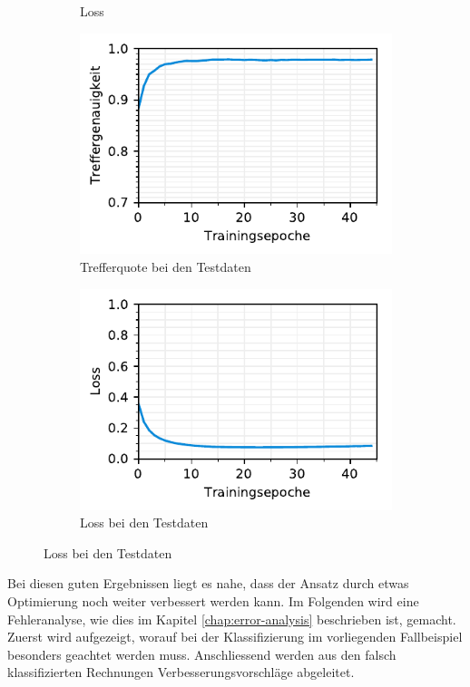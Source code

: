 \begin{figure}[h!]
\begin{subfigure}[b]{0.5\linewidth}
    \caption{Loss} 
    \label{text-class-results:loss} 
    \vspace{2ex}
  \end{subfigure} 
  \begin{subfigure}[b]{0.5\linewidth}
    \centering
    \includegraphics[scale=1]{graphics/matplot/textual-class__val_acc.pdf} 
    \caption{Trefferquote bei den Testdaten} 
    \label{text-class-results:val_acc} 
  \end{subfigure}%
  \begin{subfigure}[b]{0.5\linewidth}
    \centering
    \includegraphics[scale=1]{graphics/matplot/textual-class__val_loss.pdf} 
    \caption{Loss bei den Testdaten} 
    \label{text-class-results:val_loss} 
  \end{subfigure}
  \centering
\end{figure}

Bei diesen guten Ergebnissen liegt es nahe, dass der Ansatz durch etwas Optimierung noch weiter verbessert werden kann. Im Folgenden wird eine Fehleranalyse, wie dies im Kapitel \ref{chap:error-analysis} beschrieben ist, gemacht. Zuerst wird aufgezeigt, worauf bei der Klassifizierung im vorliegenden Fallbeispiel besonders geachtet werden muss. Anschliessend werden aus den falsch klassifizierten Rechnungen Verbesserungsvorschläge abgeleitet. 

